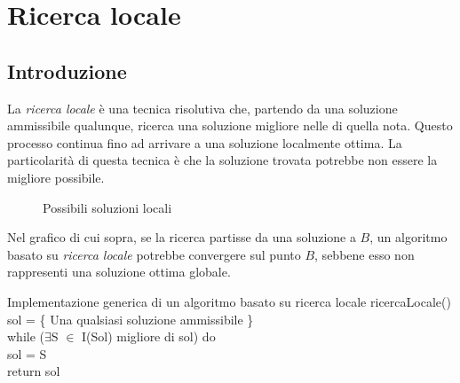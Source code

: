 \chapter{Ricerca locale}
\section{Introduzione}
La \emph{ricerca locale} è una tecnica risolutiva che, partendo da una soluzione
ammissibile qualunque, ricerca una soluzione migliore nelle  di
quella nota. Questo processo continua fino ad arrivare a una soluzione localmente
ottima. La particolarità di questa tecnica è che la soluzione trovata potrebbe
non essere la migliore possibile.

\begin{figure}[h!]
\centering
{}
\caption{Possibili soluzioni locali}
\end{figure}

\noindent
Nel grafico di cui sopra, se la ricerca partisse da una soluzione  a
$B$, un algoritmo basato su \emph{ricerca locale} potrebbe convergere sul punto
$B$, sebbene esso non rappresenti una soluzione ottima globale.

\begin{minicode}{Implementazione generica di un algoritmo basato su ricerca locale}
\ind{} ricercaLocale()\\
     sol = \{ Una qualsiasi soluzione ammissibile \}\\
    \indf while ($\exists$S $\in$ I(Sol) migliore di sol) do\\
        sol = S\\
    \indf return sol
\end{minicode}

